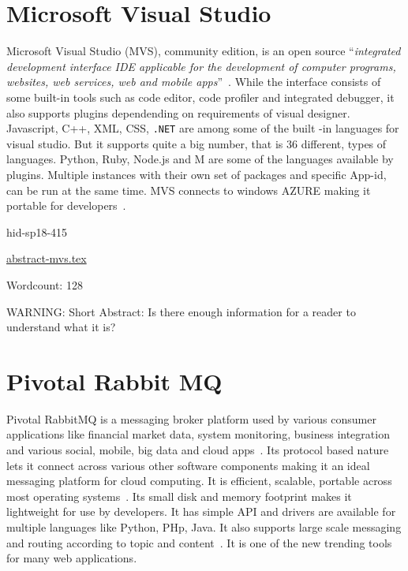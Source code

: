 \section{Microsoft Visual Studio}


Microsoft Visual Studio (MVS), community edition, is an open source \color{blue}``\emph{integrated
development interface IDE applicable for the development of computer programs, 
websites, web services, web and mobile apps}''\color{black}~\cite{hid-sp18-415-wikipedia-org}. While 
the interface consists of some built-in tools such as code editor, code profiler
and integrated debugger, it also supports plugins dependending on  requirements 
of visual designer. Javascript, C++, XML, CSS, \verb|.NET| are among some of the 
built -in languages for visual studio. But it supports quite a big number, 
that is 36 different, types of languages. Python, Ruby, Node.js and M are 
some of the languages available by plugins.  Multiple instances with their own
set of packages and specific App-id, can be run at the same time. MVS 
connects to windows AZURE making it portable for
developers~\cite{hid-sp18-415-wikipedia-org}.



\begin{IU}

hid-sp18-415

\href{https://github.com/cloudmesh-community/hid-sp18-415/blob/master//technology/abstract-mvs.tex}{abstract-mvs.tex}

 

Wordcount: 128

WARNING: Short Abstract: Is there enough information for a reader to understand what it is?

\end{IU}

\section{Pivotal Rabbit MQ}

Pivotal RabbitMQ is a messaging broker platform used by various consumer 
applications like financial market data, system monitoring, business 
integration and various social, mobile, big data and cloud 
apps~\cite{hid-sp18-415-www-pivotal}. Its protocol based nature lets 
it connect across various other software components making it an ideal 
messaging platform for cloud computing. It is efficient, scalable, 
portable across most operating systems~\cite{hid-sp18-415-www-pivotal}. Its 
small disk and memory footprint makes it lightweight for use by 
developers. It has simple API and drivers are available for multiple 
languages like Python, PHp, Java. It also supports large scale 
messaging and routing according to topic and 
content~\cite{hid-sp18-415-www-pivotal}. It is one of the new trending 
tools for many web applications.


